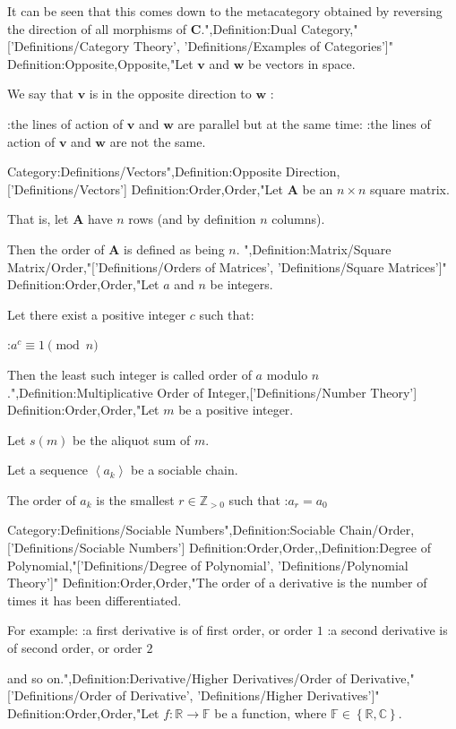 It can be seen that this comes down to the metacategory obtained by reversing the direction of all morphisms of $\mathbf C$.",Definition:Dual Category,"['Definitions/Category Theory', 'Definitions/Examples of Categories']"
Definition:Opposite,Opposite,"Let $\mathbf v$ and $\mathbf w$ be vectors in space.

We say that $\mathbf v$ is in the opposite direction to $\mathbf w$ :

:the lines of action of $\mathbf v$ and $\mathbf w$ are parallel
but at the same time:
:the lines of action of $\mathbf v$ and $\mathbf w$ are not the same.

Category:Definitions/Vectors",Definition:Opposite Direction,['Definitions/Vectors']
Definition:Order,Order,"Let $\mathbf A$ be an $n \times n$ square matrix.

That is, let $\mathbf A$ have $n$ rows (and by definition $n$ columns).


Then the order of $\mathbf A$ is defined as being $n$.
",Definition:Matrix/Square Matrix/Order,"['Definitions/Orders of Matrices', 'Definitions/Square Matrices']"
Definition:Order,Order,"Let $a$ and $n$ be integers.

Let there exist a positive integer $c$ such that:

:$a^c \equiv 1 \pmod n$


Then the least such integer is called order of $a$ modulo $n$.",Definition:Multiplicative Order of Integer,['Definitions/Number Theory']
Definition:Order,Order,"Let $m$ be a positive integer.

Let $s \left({m}\right)$ be the aliquot sum of $m$.


Let a sequence $\left\langle{a_k}\right\rangle$ be a sociable chain.

The order of $a_k$ is the smallest $r \in \mathbb Z_{>0}$ such that
:$a_r = a_0$


Category:Definitions/Sociable Numbers",Definition:Sociable Chain/Order,['Definitions/Sociable Numbers']
Definition:Order,Order,,Definition:Degree of Polynomial,"['Definitions/Degree of Polynomial', 'Definitions/Polynomial Theory']"
Definition:Order,Order,"The order of a derivative is the number of times it has been differentiated.

For example:
:a first derivative is of first order, or order $1$
:a second derivative is of second order, or order $2$

and so on.",Definition:Derivative/Higher Derivatives/Order of Derivative,"['Definitions/Order of Derivative', 'Definitions/Higher Derivatives']"
Definition:Order,Order,"Let $f: \mathbb R \to \mathbb F$ be a function, where $\mathbb F \in \left\lbrace \mathbb R, \mathbb C \right\rbrace$.

